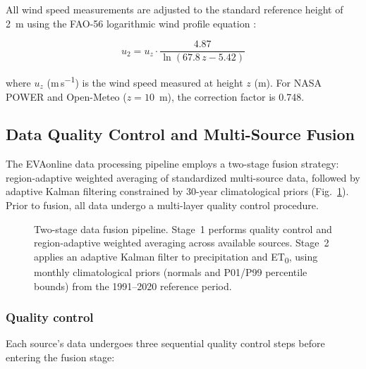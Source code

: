 \documentclass[preprint,review,12pt]{elsarticle}
\begin{document}
All wind speed measurements are adjusted to the standard reference height of
2~m using the FAO-56 logarithmic wind profile equation \citep{Allen1998}:

\begin{equation}
u_2 = u_z \cdot \frac{4.87}{\ln(67.8\,z - 5.42)}
\label{eq:wind}
\end{equation}

\noindent where $u_z$ (m\,s\textsuperscript{$-1$}) is the wind speed measured
at height $z$ (m). For NASA POWER and Open-Meteo ($z = 10$~m), the correction
factor is 0.748.


\subsection{Data Quality Control and Multi-Source Fusion}
\label{subsec:fusion}

The EVAonline data processing pipeline employs a two-stage fusion strategy:
region-adaptive weighted averaging of standardized multi-source data, followed
by adaptive Kalman filtering constrained by 30-year climatological priors
(Fig.~\ref{fig:fusion}). Prior to fusion, all data undergo a multi-layer
quality control procedure.

\begin{figure}[htbp]
\centering
\caption{Two-stage data fusion pipeline. Stage~1 performs quality control and
region-adaptive weighted averaging across available sources. Stage~2 applies an
adaptive Kalman filter to precipitation and ET\textsubscript{0}, using monthly
climatological priors (normals and P01/P99 percentile bounds) from the
1991--2020 reference period.}
\label{fig:fusion}
\end{figure}

\subsubsection*{Quality control}

Each source's data undergoes three sequential quality control steps before
entering the fusion stage:
\end{document}
